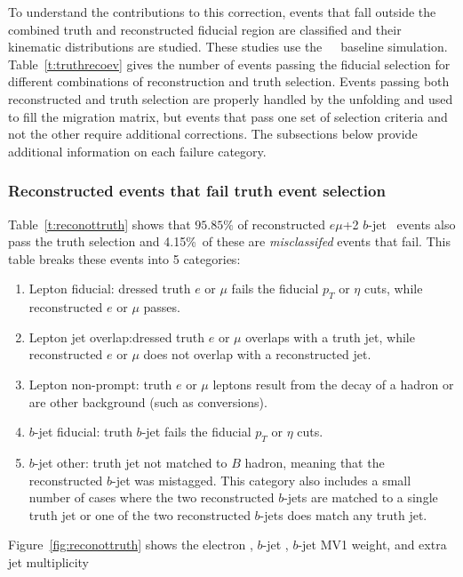 To understand the contributions to this correction, events that fall outside the combined truth and reconstructed
fiducial region are classified and their kinematic distributions are studied. 
These studies use the~\powpy~\ttbar\ baseline simulation. Table~\ref{t:truthrecoev} gives the number of events passing the fiducial selection for different combinations of reconstruction and truth selection.
Events passing both reconstructed and truth selection are properly handled by the unfolding and used to 
fill the migration matrix, but events that pass one set of selection criteria and not the other 
require additional corrections.  The subsections below provide additional information on each
failure category.

\subsubsection{Reconstructed events that fail truth event selection}
Table~\ref{t:reconottruth} shows that $95.85\%$ of reconstructed $e\mu$+2 $b$-jet \ttbar\ events also pass the truth selection
and 4.15\%\ of these are \textit{misclassifed} events that fail. 
This table breaks these events into 5 categories:
\begin{enumerate}
\item{Lepton fiducial:} dressed truth $e$ or $\mu$ fails the fiducial $p_{T}$ or $\eta$ cuts, while 
reconstructed $e$ or $\mu$ passes.
\item{Lepton jet overlap:}dressed truth $e$ or $\mu$  overlaps with a truth jet, while reconstructed $e$ or $\mu$ does not overlap with a reconstructed jet.
\item{Lepton non-prompt:} truth $e$ or $\mu$ leptons result from the decay of a hadron or are other background (such as
conversions).
\item{$b$-jet fiducial:} truth $b$-jet fails the fiducial $p_{T}$ or $\eta$ cuts.
\item{$b$-jet other:} truth jet not matched to $B$ hadron, meaning that the reconstructed $b$-jet was mistagged. 
This category also includes a small number of cases where the two reconstructed $b$-jets are matched to a single truth jet or 
one of the two reconstructed $b$-jets does match any truth jet.
\end{enumerate}
Figure~\ref{fig:reconottruth} shows the electron \pt, $b$-jet \pt, $b$-jet MV1 weight, and extra jet multiplicity 
